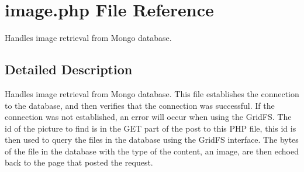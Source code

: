 \hypertarget{image_8php}{\section{image.\-php \-File \-Reference}
\label{image_8php}
}


\-Handles image retrieval from \-Mongo database.  




\subsection{\-Detailed \-Description}
\-Handles image retrieval from \-Mongo database. \-This file establishes the connection to the database, and then verifies that the connection was successful. \-If the connection was not established, an error will occur when using the \-Grid\-F\-S. \-The id of the picture to find is in the \-G\-E\-T part of the post to this \-P\-H\-P file, this id is then used to query the files in the database using the \-Grid\-F\-S interface. \-The bytes of the file in the database with the type of the content, an image, are then echoed back to the page that posted the request. 